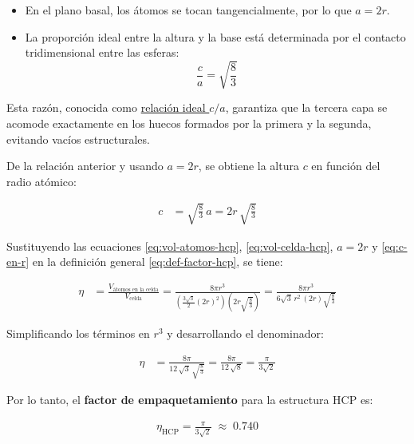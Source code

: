 \documentclass{article}
\begin{document}
\begin{itemize}
  \item[$\bullet$] En el plano basal, los átomos se tocan tangencialmente, por lo que \(a = 2r\).
  \item[$\bullet$] La proporción ideal entre la altura y la base está determinada por el contacto tridimensional entre las esferas:
  \[
  \frac{c}{a} = \sqrt{\frac{8}{3}}
  \]
\end{itemize}

Esta razón, conocida como \underline{relación ideal \(c/a\)}, garantiza que la tercera capa se acomode exactamente en los huecos formados por la primera y la segunda, evitando vacíos estructurales.

De la relación anterior y usando \(a = 2r\), se obtiene la altura \(c\) en función del radio atómico:

\begin{equation}
\begin{split}
c &= \sqrt{\frac{8}{3}}\,a = 2r\,\sqrt{\frac{8}{3}}
\end{split} \label{eq:c-en-r}
\end{equation}

Sustituyendo las ecuaciones \eqref{eq:vol-atomos-hcp}, \eqref{eq:vol-celda-hcp}, \(a=2r\) y \eqref{eq:c-en-r} en la definición general \eqref{eq:def-factor-hcp}, se tiene:

\begin{equation}
\begin{split}
\eta &= \frac{V_{\text{átomos en la celda}}}{V_{\text{celda}}}
     = \frac{8\pi r^{3}}{\left(\frac{3\sqrt{3}}{2}(2r)^{2}\right)\left(2r\sqrt{\frac{8}{3}}\right)}
     = \frac{8\pi r^{3}}{6\sqrt{3}\,r^{2}\,(2r)\sqrt{\frac{8}{3}}}
\end{split} \label{eq:eta-hcp-1}
\end{equation}

Simplificando los términos en \(r^{3}\) y desarrollando el denominador:

\begin{equation}
\begin{split}
\eta &= \frac{8\pi}{12\,\sqrt{3}\,\sqrt{\frac{8}{3}}}
     = \frac{8\pi}{12\,\sqrt{8}}
     = \frac{\pi}{3\sqrt{2}}
\end{split} \label{eq:eta-hcp-2}
\end{equation}

Por lo tanto, el \textcolor{Cerulean}{\textbf{factor de empaquetamiento}} para la estructura HCP es:

\begin{equation}
\begin{split}
\boxed{\eta_{\text{HCP}} = \frac{\pi}{3\sqrt{2}} \;\approx\; 0.740}
\end{split} \label{eq:eta-hcp-num}
\end{equation}
\end{document}
